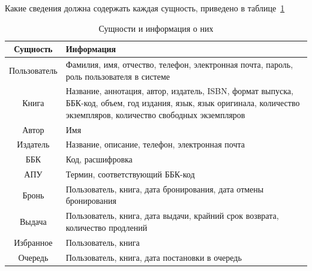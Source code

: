 Какие сведения должна содержать каждая сущность, приведено в таблице~\ref{tbl:entity}
\begin{table}[H]
	\begin{center}
		\caption{Сущности и информация о них}
		\begin{tabular}{|c|p{12cm}|}
			\hline
			\textbf{Сущность} & \textbf{Информация}\\
			\hline
			Пользователь &  Фамилия, имя, отчество, телефон, электронная почта, пароль, роль пользователя в системе\\
			\hline
			Книга & Название, аннотация, автор, издатель, ISBN, формат выпуска, ББК-код, объем, год издания, язык, язык оригинала, количество экземпляров, количество свободных экземпляров\\
			\hline
			Автор & Имя\\
			\hline
			Издатель & Название, описание, телефон, электронная почта\\
			\hline
			ББК & Код, расшифровка\\
			\hline
			АПУ & Термин, соответствующий ББК-код\\
			\hline
			Бронь & Пользователь, книга, дата бронирования, дата отмены бронирования\\
			\hline
			Выдача & Пользователь, книга, дата выдачи, крайний срок возврата, количество продлений\\
			\hline
			Избранное & Пользователь, книга\\
			\hline
			Очередь & Пользователь, книга, дата постановки в очередь\\
			\hline
		\end{tabular}
		\label{tbl:entity}
	\end{center}
\end{table}

